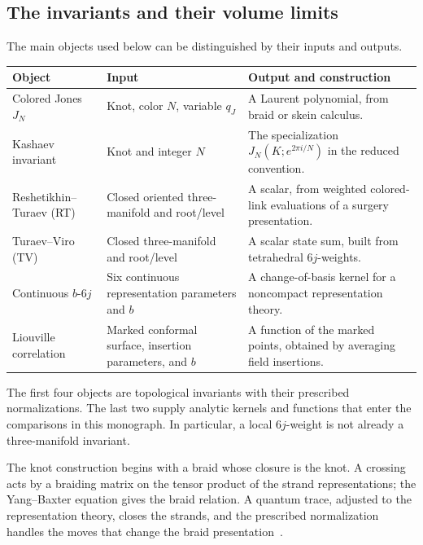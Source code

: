 \subsection{The invariants and their volume limits}
\label{sec:introinvariants}

The main objects used below can be distinguished by their inputs and
outputs.
\begin{center}
\small
\begin{tabular}{@{}>{\raggedright\arraybackslash}p{}>{\raggedright\arraybackslash}p{}>{\raggedright\arraybackslash}p{}@{}}
\toprule
Object & Input & Output and construction\\
\midrule
Colored Jones $J_N$ & Knot, color $N$, variable $q_J$
& A Laurent polynomial, from braid or skein calculus.\\[4pt]
Kashaev invariant & Knot and integer $N$
& The specialization $J_N(K;e^{2\pi i/N})$ in the reduced convention.\\[4pt]
Reshetikhin--Turaev (RT) & Closed oriented three-manifold and root/level
& A scalar, from weighted colored-link evaluations of a surgery presentation.\\[4pt]
Turaev--Viro (TV) & Closed three-manifold and root/level
& A scalar state sum, built from tetrahedral $6j$-weights.\\[4pt]
Continuous $b$-$6j$ & Six continuous representation parameters and $b$
& A change-of-basis kernel for a noncompact representation theory.\\[4pt]
Liouville correlation & Marked conformal surface, insertion parameters, and $b$
& A function of the marked points, obtained by averaging field insertions.\\
\bottomrule
\end{tabular}
\end{center}
The first four objects are topological invariants with their prescribed
normalizations. The last two supply analytic kernels and functions
that enter the comparisons in this monograph. In particular, a local
$6j$-weight is not already a three-manifold invariant.

The knot construction begins with a braid whose closure is the knot.
A crossing acts by a braiding matrix on the tensor product of the
strand representations; the Yang--Baxter equation gives the braid
relation. A quantum trace, adjusted to the representation theory,
closes the strands, and the prescribed normalization handles the
moves that change the braid presentation~\cite[Section 2]{MurakamiIntro}.

